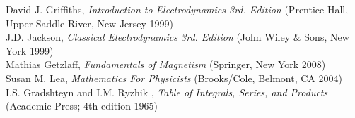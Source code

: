 \documentclass[12pt]{revtex4}
\begin{document}
\newpage
\begin{thebibliography}{number} 

David J. Griffiths, \textit{Introduction to Electrodynamics 3rd. Edition} (Prentice Hall, Upper Saddle River, New Jersey 1999)\\
J.D. Jackson, \textit{Classical Electrodynamics 3rd. Edition} (John Wiley $\&$ Sons, New York 1999)\\
Mathias Getzlaff, \textit{Fundamentals of Magnetism} (Springer, New York 2008)\\
Susan M.  Lea, \textit{Mathematics For Physicists} (Brooks/Cole, Belmont, CA 2004) \\
I.S. Gradshteyn and I.M. Ryzhik , \textit{Table of Integrals, Series, and Products} (Academic Press; 4th edition 1965)




\end{thebibliography}
\end{document}
